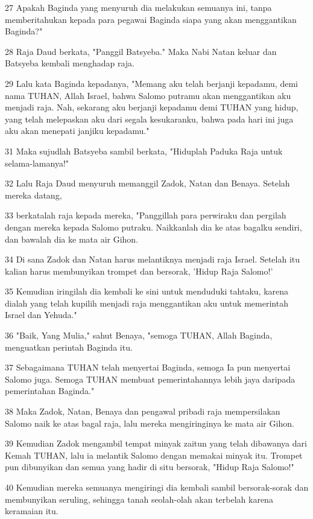 \par 27 Apakah Baginda yang menyuruh dia melakukan semuanya ini, tanpa memberitahukan kepada para pegawai Baginda siapa yang akan menggantikan Baginda?"
\par 28 Raja Daud berkata, "Panggil Batsyeba." Maka Nabi Natan keluar dan Batsyeba kembali menghadap raja.
\par 29 Lalu kata Baginda kepadanya, "Memang aku telah berjanji kepadamu, demi nama TUHAN, Allah Israel, bahwa Salomo putramu akan menggantikan aku menjadi raja. Nah, sekarang aku berjanji kepadamu demi TUHAN yang hidup, yang telah melepaskan aku dari segala kesukaranku, bahwa pada hari ini juga aku akan menepati janjiku kepadamu."
\par 31 Maka sujudlah Batsyeba sambil berkata, "Hiduplah Paduka Raja untuk selama-lamanya!"
\par 32 Lalu Raja Daud menyuruh memanggil Zadok, Natan dan Benaya. Setelah mereka datang,
\par 33 berkatalah raja kepada mereka, "Panggillah para perwiraku dan pergilah dengan mereka kepada Salomo putraku. Naikkanlah dia ke atas bagalku sendiri, dan bawalah dia ke mata air Gihon.
\par 34 Di sana Zadok dan Natan harus melantiknya menjadi raja Israel. Setelah itu kalian harus membunyikan trompet dan bersorak, 'Hidup Raja Salomo!'
\par 35 Kemudian iringilah dia kembali ke sini untuk menduduki tahtaku, karena dialah yang telah kupilih menjadi raja menggantikan aku untuk memerintah Israel dan Yehuda."
\par 36 "Baik, Yang Mulia," sahut Benaya, "semoga TUHAN, Allah Baginda, menguatkan perintah Baginda itu.
\par 37 Sebagaimana TUHAN telah menyertai Baginda, semoga Ia pun menyertai Salomo juga. Semoga TUHAN membuat pemerintahannya lebih jaya daripada pemerintahan Baginda."
\par 38 Maka Zadok, Natan, Benaya dan pengawal pribadi raja mempersilakan Salomo naik ke atas bagal raja, lalu mereka mengiringinya ke mata air Gihon.
\par 39 Kemudian Zadok mengambil tempat minyak zaitun yang telah dibawanya dari Kemah TUHAN, lalu ia melantik Salomo dengan memakai minyak itu. Trompet pun dibunyikan dan semua yang hadir di situ bersorak, "Hidup Raja Salomo!"
\par 40 Kemudian mereka semuanya mengiringi dia kembali sambil bersorak-sorak dan membunyikan seruling, sehingga tanah seolah-olah akan terbelah karena keramaian itu.

